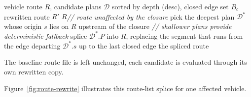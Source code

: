 \begin{algorithm}[H]
\caption{High-level pseudocode for \textsc{DepthAwareRewrite}, which selects
the deepest applicable detour and splices it into an affected route.}\label{alg:rewrite}
\begin{algorithmic}[1]
\Require vehicle route $R$, candidate plans $\mathcal{D}$ sorted by depth (desc),
         closed edge set $B_c$
\Ensure rewritten route $R'$
  \State \Return $R$\hfill\textit{// route unaffected by the closure}
\EndIf
\State pick the deepest plan $\mathcal{D}^*$ whose origin $s$ lies on $R$
       upstream of the closure
       \hfill\textit{// shallower plans provide deterministic fallback}
\State splice $\mathcal{D}^*.P$ into $R$, replacing the segment that runs
       from the edge departing $\mathcal{D}^*.s$ up to the last closed edge
\State \Return the spliced route
\end{algorithmic}
\end{algorithm}

The baseline route file is left unchanged, each candidate is evaluated through
its own rewritten copy.

Figure~\ref{fig:route-rewrite} illustrates this route-list splice for one
affected vehicle.

